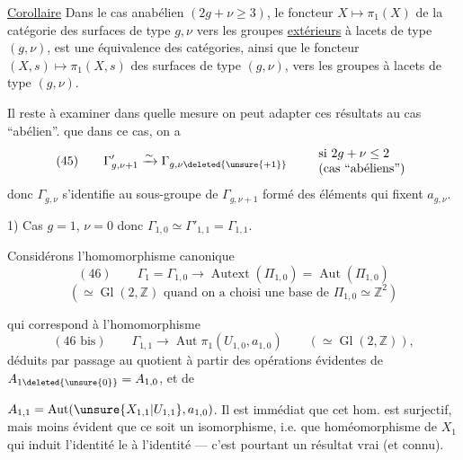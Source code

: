 \uline{Corollaire} Dans le cas anabélien $(2g+\nu\geq3)$, le foncteur $X\longmapsto\pi_1(X)$ de la catégorie  des surfaces de type $g,\nu$ vers les groupes \uline{extérieurs} à lacets de type $(g,\nu)$, est une équivalence des catégories, ainsi que le foncteur $(X,s)\longmapsto\pi_1(X,s)$  des surfaces  de type $(g,\nu)$, vers les groupes à lacets de type $(g,\nu)$.


Il reste à examiner dans quelle mesure on peut adapter ces résultats au cas ``abélien''.   que dans ce cas, on a
\[
(45)\qquad \Gamma'_{g,\nu+1}\xrightarrow{\sim}\Gamma_{g,\nu\deleted{\unsure{+1}}}
\qquad\begin{array}{l}
\text{si }2g+\nu\leq2\\
\text{(cas ``abéliens'')}
\end{array}
\]
donc $\Gamma_{g,\nu}$ s'identifie au sous-groupe de $\Gamma_{g,\nu+1}$ formé des éléments qui fixent $a_{g,\nu}$.

1) Cas $g=1$, $\nu=0$ donc $\Gamma_{1,0}\simeq\Gamma'_{1,1}=\Gamma_{1,1}$.

Considérons l'homomorphisme canonique
\[
(46)\qquad \Gamma_1=\Gamma_{1,0}\longrightarrow\operatorname{Autext}(\Pi_{1,0})=\operatorname{Aut}(\Pi_{1,0})
\]
\[
(\simeq\operatorname{Gl}(2,\mathbb{Z})\text{ quand on a choisi une base de }\Pi_{1,0}\simeq\mathbb{Z}^2)
\]

qui correspond à l'homomorphisme
\[
(46\text{ bis})\qquad\Gamma_{1,1}\longrightarrow\operatorname{Aut}\pi_1(U_{1,0},a_{1,0})
\qquad(\simeq\operatorname{Gl}(2,\mathbb{Z})),
\]
déduits  par passage au quotient à partir des  opérations évidentes de $A_{1\deleted{\unsure{0}}}=A_{1,0}$, et de

$A_{1,1}=\operatorname{Aut}(\unsure{X_{1,1}|U_{1,1}},a_{1,0})$.
Il est immédiat que cet hom. est surjectif, mais moins évident que ce soit un isomorphisme, i.e. que  homéomorphisme de $X_1$ qui induit l'identité  le    à l'identité --- c'est pourtant un résultat vrai (et connu).


